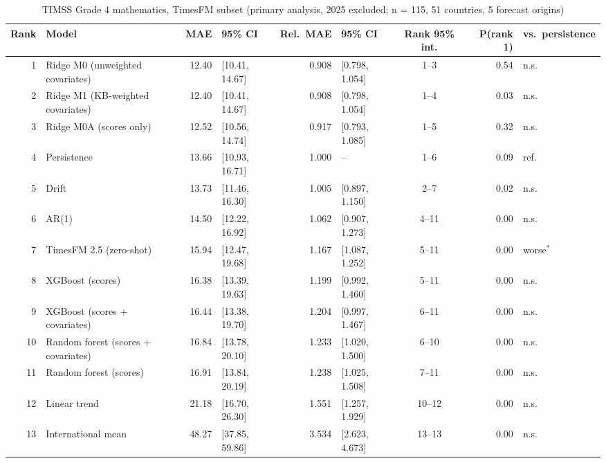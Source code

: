 \begin{table}[htbp]
\centering
\footnotesize
\caption{TIMSS Grade 4 mathematics, TimesFM subset (primary analysis, 2025 excluded; n = 115, 51 countries, 5 forecast origins)}
\label{tab:A15}
\begin{tabular}{rlrlrlcrl}
\toprule
Rank & Model & MAE & 95\% CI & Rel.\ MAE & 95\% CI & Rank 95\% int. & P(rank 1) & vs.\ persistence \\
\midrule
1 & Ridge M0 (unweighted covariates) & 12.40 & [10.41, 14.67] & 0.908 & [0.798, 1.054] & 1--3 & 0.54 & n.s. \\
2 & Ridge M1 (KB-weighted covariates) & 12.40 & [10.41, 14.67] & 0.908 & [0.798, 1.054] & 1--4 & 0.03 & n.s. \\
3 & Ridge M0A (scores only) & 12.52 & [10.56, 14.74] & 0.917 & [0.793, 1.085] & 1--5 & 0.32 & n.s. \\
4 & Persistence & 13.66 & [10.93, 16.71] & 1.000 & -- & 1--6 & 0.09 & ref. \\
5 & Drift & 13.73 & [11.46, 16.30] & 1.005 & [0.897, 1.150] & 2--7 & 0.02 & n.s. \\
6 & AR(1) & 14.50 & [12.22, 16.92] & 1.062 & [0.907, 1.273] & 4--11 & 0.00 & n.s. \\
7 & TimesFM 2.5 (zero-shot) & 15.94 & [12.47, 19.68] & 1.167 & [1.087, 1.252] & 5--11 & 0.00 & worse$^{*}$ \\
8 & XGBoost (scores) & 16.38 & [13.39, 19.63] & 1.199 & [0.992, 1.460] & 5--11 & 0.00 & n.s. \\
9 & XGBoost (scores + covariates) & 16.44 & [13.38, 19.70] & 1.204 & [0.997, 1.467] & 6--11 & 0.00 & n.s. \\
10 & Random forest (scores + covariates) & 16.84 & [13.78, 20.10] & 1.233 & [1.020, 1.500] & 6--10 & 0.00 & n.s. \\
11 & Random forest (scores) & 16.91 & [13.84, 20.19] & 1.238 & [1.025, 1.508] & 7--11 & 0.00 & n.s. \\
12 & Linear trend & 21.18 & [16.70, 26.30] & 1.551 & [1.257, 1.929] & 10--12 & 0.00 & n.s. \\
13 & International mean & 48.27 & [37.85, 59.86] & 3.534 & [2.623, 4.673] & 13--13 & 0.00 & n.s. \\
\bottomrule
\end{tabular}
\par{}
\end{table}
